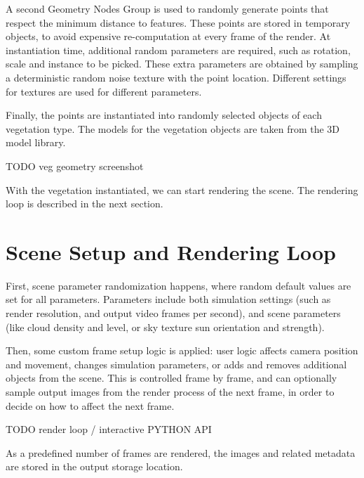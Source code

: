 A second Geometry Nodes Group is used to randomly generate points that respect the minimum distance to features. These points are stored in temporary objects, to avoid expensive re-computation at every frame of the render. At instantiation time, additional random parameters are required, such as rotation, scale and instance to be picked. These extra parameters are obtained by sampling a deterministic random noise texture with the point location. Different settings for textures are used for different parameters.

Finally, the points are instantiated into randomly selected objects of each vegetation type. The models for the vegetation objects are taken from the 3D model library.


TODO veg geometry screenshot


With the vegetation instantiated, we can start rendering the scene. The rendering loop is described in the next section.

\section{Scene Setup and Rendering Loop}
\label{sec:rendering}


First, scene parameter randomization happens, where random default values are set for all parameters. Parameters include both simulation settings (such as render resolution, and output video frames per second), and scene parameters (like cloud density and level, or sky texture sun orientation and strength).

Then, some custom frame setup logic is applied: user logic affects camera position and movement, changes simulation parameters, or adds and removes additional objects from the scene. This is controlled frame by frame, and can optionally sample output images from the render process of the next frame, in order to decide on how to affect the next frame.

TODO render loop / interactive PYTHON API

As a predefined number of frames are rendered, the images and related metadata are stored in the output storage location.
